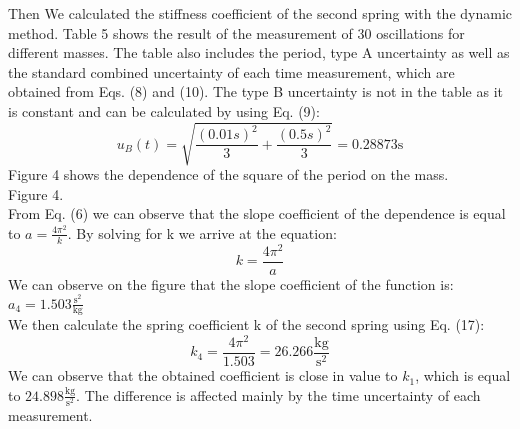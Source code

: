 \documentclass{article}
\begin{document}
Then We calculated the stiffness coefficient of the second spring with the dynamic method. 
Table 5 shows the result of the measurement of 30 oscillations for different masses. The table also includes the period, type A uncertainty as well as the standard combined uncertainty of each time measurement, which are obtained from Eqs. (8) and (10). The type B uncertainty is not in the table as it is constant and can be calculated by using Eq. (9): \\
\begin{equation}
    u_B(t) = \sqrt{\frac{(0.01 s)^2}{3} + \frac{(0.5 s)^2}{3}} = 0.28873 \mathrm{s}
\end{equation}
Figure 4 shows the dependence of the square of the period on the mass. \\
Figure 4. \\ 
From Eq. (6) we can observe that the slope coefficient of the dependence is equal to \(a = \frac{4 \pi ^2}{k}\). By solving for k we arrive at the equation:
\begin{equation}
    k = \frac{4 \pi ^2}{a}
\end{equation}
We can observe on the figure that the slope coefficient of the function is: \(a_4 = 1.503 \mathrm{\frac{s^2}{kg}}\) \\ 
We then calculate the spring coefficient k of the second spring using Eq. (17): \\
\begin{equation}
    k_4 = \frac{4 \pi ^2}{1.503} = 26.266 \mathrm{\frac{kg}{s^2}}
\end{equation}
We can observe that the obtained coefficient is close in value to \(k_1\), which is equal to \(24.898 \mathrm{\frac{kg}{s^2}}\). The difference is affected mainly by the time uncertainty of each measurement. 
\end{document}
